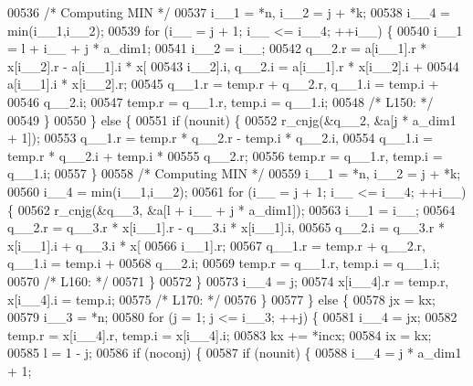 \begin{DoxyCode}
00536 \textcolor{comment}{/* Computing MIN */}
00537             i\_\_1 = *n, i\_\_2 = j + *k;
00538             i\_\_4 = min(i\_\_1,i\_\_2);
00539             \textcolor{keywordflow}{for} (i\_\_ = j + 1; i\_\_ <= i\_\_4; ++i\_\_) \{
00540                 i\_\_1 = l + i\_\_ + j * a\_dim1;
00541                 i\_\_2 = i\_\_;
00542                 q\_\_2.r = a[i\_\_1].r * x[i\_\_2].r - a[i\_\_1].i * x[
00543                     i\_\_2].i, q\_\_2.i = a[i\_\_1].r * x[i\_\_2].i + 
00544                     a[i\_\_1].i * x[i\_\_2].r;
00545                 q\_\_1.r = temp.r + q\_\_2.r, q\_\_1.i = temp.i + 
00546                     q\_\_2.i;
00547                 temp.r = q\_\_1.r, temp.i = q\_\_1.i;
00548 \textcolor{comment}{/* L150: */}
00549             \}
00550             \} \textcolor{keywordflow}{else} \{
00551             \textcolor{keywordflow}{if} (nounit) \{
00552                 r\_cnjg(&q\_\_2, &a[j * a\_dim1 + 1]);
00553                 q\_\_1.r = temp.r * q\_\_2.r - temp.i * q\_\_2.i, 
00554                     q\_\_1.i = temp.r * q\_\_2.i + temp.i * 
00555                     q\_\_2.r;
00556                 temp.r = q\_\_1.r, temp.i = q\_\_1.i;
00557             \}
00558 \textcolor{comment}{/* Computing MIN */}
00559             i\_\_1 = *n, i\_\_2 = j + *k;
00560             i\_\_4 = min(i\_\_1,i\_\_2);
00561             \textcolor{keywordflow}{for} (i\_\_ = j + 1; i\_\_ <= i\_\_4; ++i\_\_) \{
00562                 r\_cnjg(&q\_\_3, &a[l + i\_\_ + j * a\_dim1]);
00563                 i\_\_1 = i\_\_;
00564                 q\_\_2.r = q\_\_3.r * x[i\_\_1].r - q\_\_3.i * x[i\_\_1].i, 
00565                     q\_\_2.i = q\_\_3.r * x[i\_\_1].i + q\_\_3.i * x[
00566                     i\_\_1].r;
00567                 q\_\_1.r = temp.r + q\_\_2.r, q\_\_1.i = temp.i + 
00568                     q\_\_2.i;
00569                 temp.r = q\_\_1.r, temp.i = q\_\_1.i;
00570 \textcolor{comment}{/* L160: */}
00571             \}
00572             \}
00573             i\_\_4 = j;
00574             x[i\_\_4].r = temp.r, x[i\_\_4].i = temp.i;
00575 \textcolor{comment}{/* L170: */}
00576         \}
00577         \} \textcolor{keywordflow}{else} \{
00578         jx = kx;
00579         i\_\_3 = *n;
00580         \textcolor{keywordflow}{for} (j = 1; j <= i\_\_3; ++j) \{
00581             i\_\_4 = jx;
00582             temp.r = x[i\_\_4].r, temp.i = x[i\_\_4].i;
00583             kx += *incx;
00584             ix = kx;
00585             l = 1 - j;
00586             \textcolor{keywordflow}{if} (noconj) \{
00587             \textcolor{keywordflow}{if} (nounit) \{
00588                 i\_\_4 = j * a\_dim1 + 1;

\end{DoxyCode}

